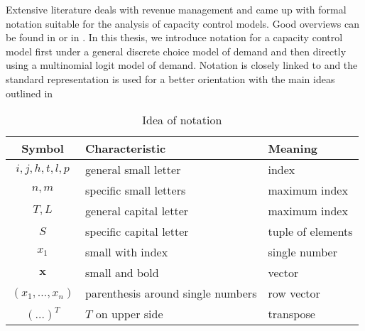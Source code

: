 
Extensive literature deals with revenue management and came up with formal notation suitable for the analysis of capacity control models. Good overviews can be found in \cite{Klein.2008} or in \cite{Phillips.2011}. In this thesis, we introduce notation for a capacity control model first under a general discrete choice model of demand and then directly using a multinomial logit model of demand. Notation is closely linked to \cite{Koch.2017} and the standard representation is used for a better orientation with the main ideas outlined in 

\begin{table}
	\caption{Idea of notation}\label{tb:Prob:Notation}
	\begin{tabular}{cll}
		\toprule
		Symbol & Characteristic & Meaning\\
		\midrule
		$i, j, h, t, l, p$ & general small letter & index\\
		$n, m$ & specific small letters & maximum index\\
		$T, L$ & general capital letter & maximum index\\
		$S$ & {\color{red}specific capital letter} & tuple of elements\\
		$x_1$ & small with index & single number\\
		$\boldsymbol{x}$ & small and bold & vector\\
		$(x_1, \dots, x_n)$ & parenthesis around single numbers & row vector\\
		$(\dots)^T$ & $T$ on upper side & transpose\\
		
	\end{tabular}
\end{table}

